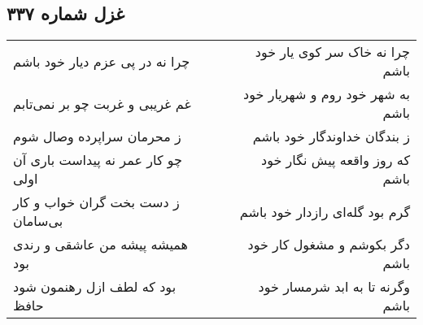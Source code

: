 \begin{center}
\section*{غزل شماره ۳۳۷}
\label{sec:sh337}
\begin{longtable}{l p{0.5cm} r}
چرا نه در پی عزم دیار خود باشم
&&
چرا نه خاک سر کوی یار خود باشم
\\
غم غریبی و غربت چو بر نمی‌تابم
&&
به شهر خود روم و شهریار خود باشم
\\
ز محرمان سراپرده وصال شوم
&&
ز بندگان خداوندگار خود باشم
\\
چو کار عمر نه پیداست باری آن اولی
&&
که روز واقعه پیش نگار خود باشم
\\
ز دست بخت گران خواب و کار بی‌سامان
&&
گرم بود گله‌ای رازدار خود باشم
\\
همیشه پیشه من عاشقی و رندی بود
&&
دگر بکوشم و مشغول کار خود باشم
\\
بود که لطف ازل رهنمون شود حافظ
&&
وگرنه تا به ابد شرمسار خود باشم
\\
\end{longtable}
\end{center}
